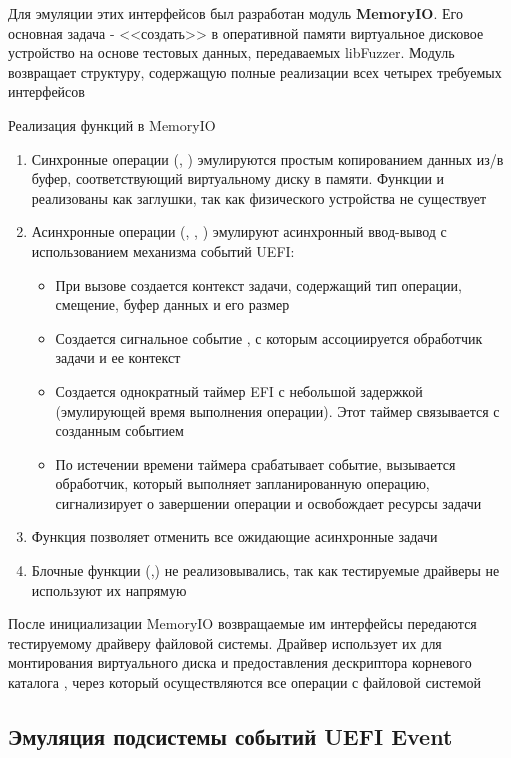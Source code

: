 Для эмуляции этих интерфейсов был разработан модуль\textbf{ MemoryIO}. Его основная задача  - <<создать>> в оперативной памяти виртуальное дисковое устройство на основе тестовых данных, передаваемых libFuzzer. Модуль возвращает структуру, содержащую полные реализации всех четырех требуемых интерфейсов

Реализация функций в MemoryIO
\begin{enumerate}
	\item Синхронные операции (, ) эмулируются простым копированием данных из/в буфер, соответствующий виртуальному диску в памяти. Функции  и  реализованы как заглушки, так как физического устройства не существует
	\item Асинхронные операции  (, , )  эмулируют асинхронный ввод-вывод с использованием механизма событий UEFI:
	\begin{itemize}
		\item При вызове создается контекст задачи, содержащий тип операции, смещение, буфер данных и его размер
		\item Создается  сигнальное событие , с которым ассоциируется обработчик задачи и ее контекст
		\item Создается однократный таймер EFI с небольшой задержкой (эмулирующей время выполнения операции). Этот таймер связывается с созданным событием
		\item По истечении времени таймера срабатывает событие, вызывается обработчик, который выполняет запланированную операцию, сигнализирует о завершении операции и освобождает ресурсы задачи
	\end{itemize}
	\item Функция   позволяет отменить все ожидающие асинхронные задачи
    \item Блочные функции (,) не реализовывались, так как тестируемые драйверы не используют их напрямую
\end{enumerate}

После инициализации MemoryIO возвращаемые им интерфейсы передаются тестируемому драйверу файловой системы. Драйвер использует их для монтирования виртуального диска и предоставления дескриптора корневого каталога , через который осуществляются все операции с файловой системой

\subsection{Эмуляция подсистемы событий UEFI Event}

